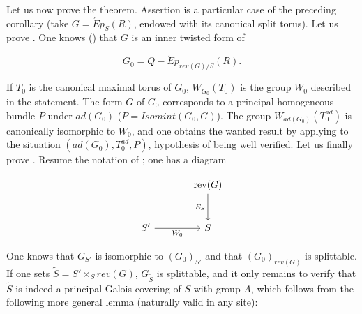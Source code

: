 Let us now prove the theorem. Assertion  is a particular case of the preceding corollary (take \(G =
\acute{E}p_{S}(R)\), endowed with its canonical split torus). Let us prove . One knows () that \(G\) is an inner
twisted form of

\[ G_{0} = Q-\acute{E}p_{rev(G)/S}(R). \]

If \(T_0\) is the canonical maximal torus of \(G_0\), \(W_{G_{0}}(T_{0})\) is the group \(W_0\) described in the statement. The
form \(G\) of \(G_0\) corresponds to a principal homogeneous bundle \(P\) under \(ad(G_{0})\) (\(P = Isomint(G_{0}, G)\)). The
group \(W_{ad(G_{0})}(T^{ad}_{0})\) is canonically isomorphic to \(W_0\), and one obtains the wanted result by applying
 to the situation \((ad(G_{0}), T^{ad}_{0}, P)\), hypothesis  of  being well verified. Let us finally prove
. Resume the notation of ; one has a diagram

\[
\begin{tikzcd}[column sep=large,row sep=large]
&
\operatorname{rev}(G) \arrow[d,"E_S"']
\\
S'
  \arrow[r,"W_0"']
&
S
\end{tikzcd}


\]

One knows that \(G_{S'}\) is isomorphic to \((G_{0})_{S'}\) and that \((G_{0})_{rev(G)}\) is splittable. If one sets
\(\tilde{S} = S' \times_{S} rev(G)\), \(G_{\tilde{S}}\) is splittable, and it only remains to verify that \(\tilde{S}\) is
indeed a principal Galois covering of \(S\) with group \(A\), which follows from the following more general lemma (naturally
valid in any site):




